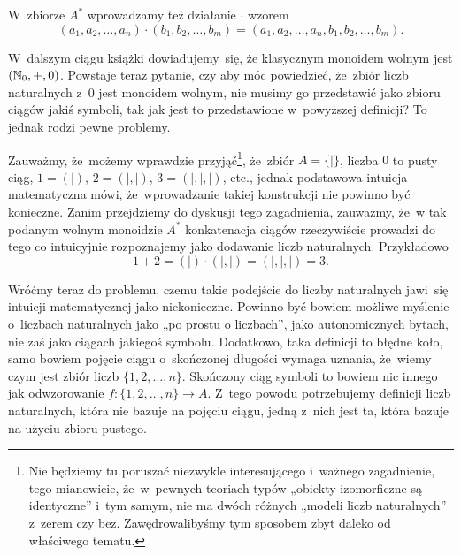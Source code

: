 \documentclass[a4paper,11pt]{article}
\begin{document}
W~zbiorze $A^{ * }$ wprowadzamy też działanie $\cdot$ wzorem
\begin{equation}
  \label{eq:Froys-Forys-03}
  ( a_{ 1 }, a_{ 2 }, \ldots, a_{ n } ) \cdot ( b_{ 1 }, b_{ 2 }, \ldots, b_{ m } ) =
  ( a_{ 1 }, a_{ 2 }, \ldots, a_{ n }, b_{ 1 }, b_{ 2 }, \ldots, b_{ m } ).
\end{equation}

W~dalszym ciągu książki dowiadujemy~się, że klasycznym monoidem wolnym jest
$( \mathbb{N}_{ 0 }, +, 0 )$. Powstaje teraz pytanie, czy aby móc powiedzieć,
że~zbiór liczb naturalnych z~$0$ jest monoidem wolnym, nie musimy go
przedstawić jako zbioru ciągów jakiś symboli, tak jak jest to przedstawione
w~powyższej definicji? To jednak rodzi pewne problemy.

Zauważmy, że~możemy wprawdzie przyjąć\footnote{Nie będziemy tu poruszać
  niezwykle interesującego i~ważnego zagadnienie, tego mianowicie,
  że~w~pewnych teoriach typów „obiekty izomorficzne są identyczne” i~tym
  samym, nie ma dwóch różnych „modeli liczb naturalnych” z~zerem czy bez.
  Zawędrowalibyśmy tym sposobem zbyt daleko od właściwego tematu.}, że~zbiór
$A = \{ | \}$, liczba $0$ to pusty ciąg, $1 = ( | )$, $2 = ( |, | )$,
$3 = ( |, |, | )$, etc., jednak podstawowa intuicja matematyczna mówi,
że~wprowadzanie takiej konstrukcji nie powinno być konieczne. Zanim
przejdziemy do dyskusji tego zagadnienia, zauważmy, że~w tak podanym wolnym
monoidzie $A^{ * }$ konkatenacja ciągów rzeczywiście prowadzi do tego co
intuicyjnie rozpoznajemy jako dodawanie liczb naturalnych. Przykładowo
\begin{equation}
  \label{eq:Forys-Forys-04}
  1 + 2 = ( | ) \cdot ( |, | ) = ( |, |, | ) = 3.
\end{equation}

Wróćmy teraz do problemu, czemu takie podejście do liczby naturalnych
jawi~się intuicji matematycznej jako niekonieczne. Powinno być bowiem
możliwe myślenie o~liczbach naturalnych jako „po prostu o liczbach”, jako
autonomicznych bytach, nie zaś jako ciągach jakiegoś symbolu. Dodatkowo,
taka definicji to błędne koło, samo bowiem pojęcie ciągu o~skończonej
długości wymaga uznania, że~wiemy czym jest zbiór liczb $\{ 1, 2, \ldots, n \}$.
Skończony ciąg symboli to bowiem nic innego jak odwzorowanie
$f : \{ 1, 2, \ldots, n \} \to A$. Z~tego powodu potrzebujemy definicji liczb
naturalnych, która nie bazuje na pojęciu ciągu, jedną z~nich jest ta, która
bazuje na użyciu zbioru pustego.
\end{document}
